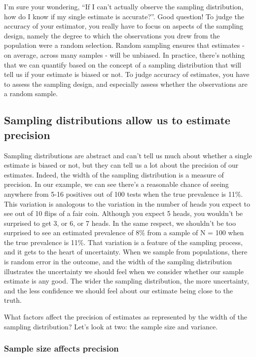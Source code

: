 \documentclass[
]{book}
\begin{document}
I'm sure your wondering, ``If I can't actually observe the sampling distribution, how do I know if my single estimate is accurate?''. Good question! To judge the accuracy of your estimator, you really have to focus on aspects of the sampling design, namely the degree to which the observations you drew from the population were a random selection. Random sampling ensures that estimates - on average, across many samples - will be unbiased. In practice, there's nothing that we can quantify based on the concept of a sampling distribution that will tell us if your estimate is biased or not. To judge accuracy of estimates, you have to assess the sampling design, and especially assess whether the observations are a random sample.

\subsection{Sampling distributions allow us to estimate precision}\label{sampling-distributions-allow-us-to-estimate-precision}

Sampling distributions are abstract and can't tell us much about whether a single estimate is biased or not, but they can tell us a lot about the precision of our estimates. Indeed, the width of the sampling distribution is a measure of precision. In our example, we can see there's a reasonable chance of seeing anywhere from 5-16 positives out of 100 tests when the true prevalence is 11\%. This variation is analogous to the variation in the number of heads you expect to see out of 10 flips of a fair coin. Although you expect 5 heads, you wouldn't be surprised to get 3, or 6, or 7 heads. In the same respect, we shouldn't be too surprised to see an estimated prevalence of 8\% from a sample of N = 100 when the true prevalence is 11\%. That variation is a feature of the sampling process, and it gets to the heart of uncertainty. When we sample from populations, there is random error in the outcome, and the width of the sampling distribution illustrates the uncertainty we should feel when we consider whether our sample estimate is any good. The wider the sampling distribution, the more uncertainty, and the less confidence we should feel about our estimate being close to the truth.

What factors affect the precision of estimates as represented by the width of the sampling distribution? Let's look at two: the sample size and variance.

\subsubsection{Sample size affects precision}\label{sample-size-affects-precision}
\end{document}
